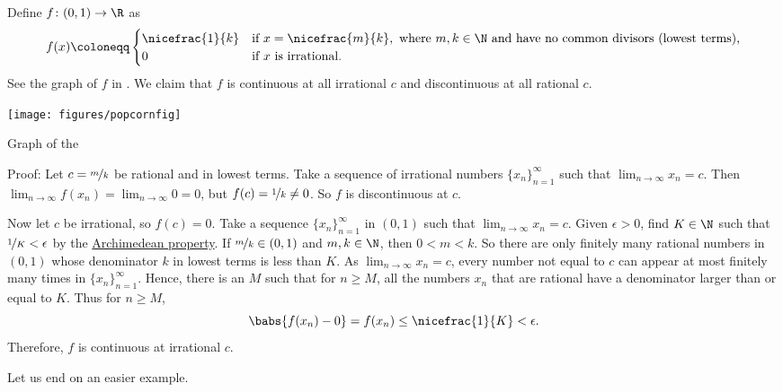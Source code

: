 \begin{example} \label{popcornfunction:example}
Define $f \colon (0,1) \to \R$ as
\begin{equation*}
f(x) \coloneqq 
\begin{cases}
\nicefrac{1}{k} & \text{if } x=\nicefrac{m}{k}, \text{ where } m,k \in \N
\text{ and have no common divisors (lowest terms),} \\
0 & \text{if } x \text{ is irrational.}
\end{cases}
\end{equation*}
See the graph of $f$
in .
We claim that
$f$ is continuous at all irrational $c$ and 
discontinuous at all rational $c$.
\begin{myfigureht}
\texttt{[image: figures/popcornfig]}
\caption{Graph of the \label{popcornfig}}
\end{myfigureht}

Proof:
Let $c = \nicefrac{m}{k}$ be rational and in lowest terms.  Take a sequence of
irrational numbers $\{ x_n \}_{n=1}^\infty$ such that $\lim_{n\to\infty} x_n = c$.  Then
$\lim_{n\to\infty} f(x_n) = \lim_{n\to\infty} 0 = 0$, but $f(c) = \nicefrac{1}{k} \not= 0$.  So $f$
is discontinuous at $c$.

Now let $c$ be irrational, so $f(c) = 0$.  Take a sequence 
$\{ x_n \}_{n=1}^\infty$ in $(0,1)$ such that $\lim_{n\to\infty} x_n = c$.
Given $\epsilon > 0$, find $K \in \N$ such
that $\nicefrac{1}{K} < \epsilon$
by the \hyperref[thm:arch:i]{Archimedean property}.
If $\nicefrac{m}{k} \in (0,1)$ and $m,k \in \N$, then $0 < m < k$.
So there are only finitely many rational numbers in $(0,1)$
whose denominator $k$ in lowest terms is less than $K$.
As $\lim_{n\to\infty} x_n = c$, every number not equal to $c$ can appear at most
finitely many times in $\{ x_n \}_{n=1}^\infty$.
Hence,
there is an $M$ such that for $n \geq M$, all the numbers $x_n$
that are rational
have a denominator larger than or equal to $K$.  Thus for $n \geq M$,
\begin{equation*}
\babs{f(x_n) - 0} = f(x_n) \leq \nicefrac{1}{K} < \epsilon .
\end{equation*}
Therefore, $f$ is continuous at irrational $c$.
\end{example}

Let us end on an easier example.


